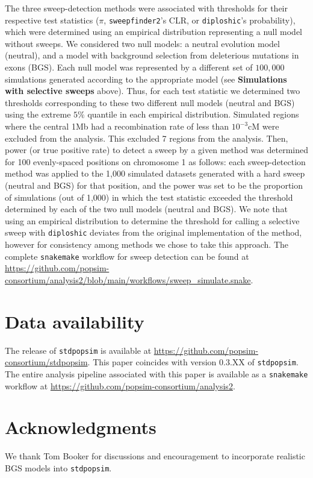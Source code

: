 \documentclass[hidelinks]{article}
\newcommand{\stdpopsim}{\texttt{stdpopsim}\xspace}
\newcommand{\snakemake}{\texttt{snakemake}\xspace}
\newcommand{\sweepfinder}{\texttt{sweepfinder2}\xspace}
\newcommand{\diploshic}{\texttt{diploshic}\xspace}
\begin{document}
    The three sweep-detection methods were associated with thresholds for their respective test statistics
    ($\pi$, \sweepfinder's CLR, or \diploshic's probability),
    which were determined using an empirical distribution representing a null model without sweeps.
    We considered two null models: a neutral evolution model (neutral),
    and a model with background selection from deleterious mutations in exons (BGS).
    Each null model was represented by a different set of $100,000$ simulations generated according to the appropriate model
    (see \textbf{Simulations with selective sweeps} above).
    Thus, for each test statistic we determined two thresholds corresponding to these two different null models (neutral and BGS)
    using the extreme $5\%$ quantile in each empirical distribution.
    Simulated regions where the central 1Mb had a recombination rate of less than $10^{-3}$cM were excluded from the analysis.
    This excluded 7 regions from the analysis. 
    Then, power (or true positive rate) to detect a sweep by a given method was determined for
    100 evenly-spaced positions on chromosome 1 as follows:
    each sweep-detection method was applied to the 1,000 
    simulated datasets generated with a hard sweep (neutral and BGS) for that position,
    and the power was set to be the proportion of simulations (out of 1,000)
    in which the test statistic exceeded the threshold determined by each of the two null models (neutral and BGS).
    We note that using an empirical distribution to determine the threshold for calling a selective
    sweep with \diploshic deviates from the original implementation of the method,
    however for consistency among methods we chose to take this approach.
    The complete \snakemake workflow for sweep detection can be found at
    \url{https://github.com/popsim-consortium/analysis2/blob/main/workflows/sweep_simulate.snake}.

\section*{Data availability}\label{data_availability}
The release of \stdpopsim is available at \url{https://github.com/popsim-consortium/stdpopsim}.
This paper coincides with version 0.3.XX of \stdpopsim. %
The entire analysis pipeline associated with this paper is available
as a \snakemake workflow at \url{https://github.com/popsim-consortium/analysis2}.

\section*{Acknowledgments}\label{acknowledgements}
We thank Tom Booker for discussions and encouragement to incorporate realistic BGS models into \stdpopsim.
\end{document}
